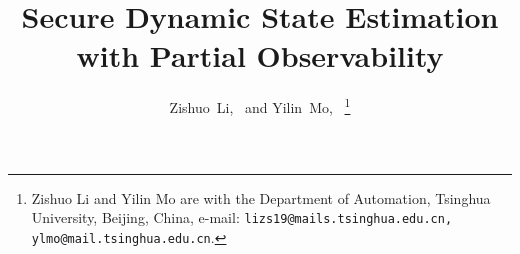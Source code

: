 \documentclass[journal]{IEEEtran}
\begin{document}
	\title{Secure Dynamic State Estimation with Partial Observability}
	
	\author{Zishuo~Li,~
		and Yilin~Mo,~
		\thanks{Zishuo Li and Yilin Mo are with the Department
			of Automation, Tsinghua University, Beijing, China, e-mail: \texttt{lizs19@mails.tsinghua.edu.cn, ylmo@mail.tsinghua.edu.cn}. } }%
	
	
	
	
	
	
\end{document}
